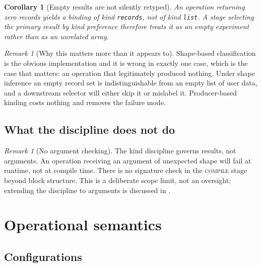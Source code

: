 \documentclass[11pt,twocolumn,a4paper]{article}
\theoremstyle{ssthm}
\newtheorem{corollary}[theorem]{Corollary}
\theoremstyle{definition}
\theoremstyle{remark}
\newtheorem{remark}[theorem]{Remark}
\newcommand{\shk}[1]{\texttt{#1}}
\begin{document}
\begin{corollary}[Empty results are not silently retyped]
\label{cor:empty-kind}
An operation returning zero records yields a binding of kind
\shk{records}, not of kind \shk{list}. A stage selecting the primary result
by kind preference therefore treats it as an empty experiment rather than
as an unrelated array.
\end{corollary}

\begin{remark}[Why this matters more than it appears to]
\label{rem:kind-why}
Shape-based classification is the obvious implementation and it is
wrong in exactly one case, which is the case that matters: an operation
that legitimately produced nothing. Under shape inference an empty
record set is indistinguishable from an empty list of user data, and a
downstream selector will either skip it or mislabel it. Producer-based
kinding costs nothing and removes the failure mode.
\end{remark}

\subsection{What the discipline does not do}

\begin{remark}[No argument checking]
\label{rem:no-argcheck}
The kind discipline governs results, not arguments. An operation
receiving an argument of unexpected shape will fail at runtime, not at
compile time. There is no signature check in the \textsc{compile} stage
beyond block structure. This is a deliberate scope limit, not an
oversight; extending the discipline to arguments is discussed in
.
\end{remark}

\section{Operational semantics}
\label{sec:semantics}

\subsection{Configurations}
\end{document}
